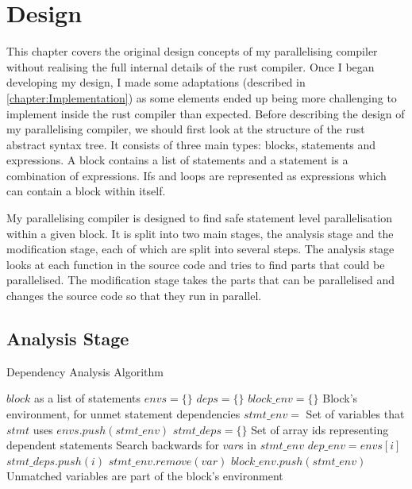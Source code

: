 \chapter{Design}
\label{chapter:Design}
This chapter covers the original design concepts of my parallelising compiler without realising the full internal details of the rust compiler. Once I began developing my design, I made some adaptations (described in \autoref{chapter:Implementation}) as some elements ended up being more challenging to implement inside the rust compiler than expected.
Before describing the design of my parallelising compiler, we should first look at the structure of the rust abstract syntax tree. It consists of three main types: blocks, statements and expressions. A block contains a list of statements and a statement is a combination of expressions. Ifs and loops are represented as expressions which can contain a block within itself.

My parallelising compiler is designed to find safe statement level parallelisation within a given block. It is split into two main stages, the analysis stage and the modification stage, each of which are split into several steps. The analysis stage looks at each function in the source code and tries to find parts that could be parallelised. The modification stage takes the parts that can be parallelised and changes the source code so that they run in parallel.

\section{Analysis Stage}
\begin{algorithm}[H]
\caption{Dependency Analysis Algorithm}
\label{alg:dependency-analysis}
\begin{algorithmic}[1]
    \Require $block$ as a list of statements
    \State $envs = \{\}$
    \State $deps = \{\}$
    \State $block\_env = \{\}$ \Comment Block's environment, for unmet statement dependencies
        \State $stmt\_env =$ Set of variables that $stmt$ uses
        \State $envs.push(stmt\_env)$
        \State $stmt\_deps = \{\}$ \Comment Set of array ids representing dependent statements
         \Comment Search backwards for $var$s in $stmt\_env$
            \State $dep\_env = envs[i]$
                \State $stmt\_deps.push(i)$
                \State $stmt\_env.remove(var)$
            \EndFor
        \EndFor
        \State $block\_env.push(stmt\_env)$ \Comment Unmatched variables are part of the block's environment
    \EndFor
\end{algorithmic}
\end{algorithm}

